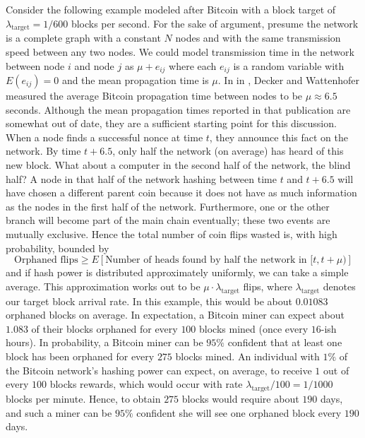 \documentclass[12pt,english]{mrl}
\theoremstyle{definition}
\renewcommand{\geq}{\geqslant}
\numberwithin{equation}{section}
\numberwithin{figure}{section}
\numberwithin{equation}{section}
\numberwithin{equation}{section}
\numberwithin{figure}{section}
\begin{document}
Consider the following example modeled after Bitcoin with a block target of $\lambda_{\text{target}}=1/600$ blocks per second. For the sake of argument, presume the network is a complete graph with a constant $N$ nodes and with the same transmission speed between any two nodes. We could model transmission time in the network between node $i$ and node $j$ as $\mu + e_{ij}$ where each $e_{ij}$ is a random variable with $E(e_{ij}) = 0$ and the mean propagation time is $\mu$. In in \cite{decker2013information}, Decker and Wattenhofer measured the average Bitcoin propagation time between nodes to be $\mu \approx 6.5$ seconds. Although the mean propagation times reported in that publication are somewhat out of date, they are a sufficient starting point for this discussion. When a node finds a successful nonce at time $t$, they announce this fact on the network. By time $t+6.5$, only half the network (on average) has heard of this new block. What about a computer in the second half of the network, the blind half? A node in that half of the network hashing between time $t$ and $t+6.5$ will have chosen a different parent coin because it does not have as much information as the nodes in the first half of the network.  Furthermore, one or the other branch will become part of the main chain eventually; these two events are mutually exclusive. Hence the total number of coin flips wasted is, with high probability, bounded by
\[\text{Orphaned flips} \geq E\left[\text{Number of heads found by half the network in }[t,t+\mu)\right]\]
and if hash power is distributed approximately uniformly, we can take a simple average. This approximation works out to be $\mu\cdot \lambda_{\text{target}}$ flips, where $\lambda_{\text{target}}$ denotes our target block arrival rate. In this example, this would be about $0.01083$ orphaned blocks on average. In expectation, a Bitcoin miner can expect about $1.083$ of their blocks orphaned for every $100$ blocks mined (once every $16$-ish hours). In probability, a Bitcoin miner can be $95\%$ confident that at least one block has been orphaned for every $275$ blocks mined. An individual with $1\%$ of the Bitcoin network's hashing power can expect, on average, to receive $1$ out of every $100$ blocks rewards, which would occur with rate $\lambda_{\text{target}}/100 = 1/1000$ blocks per minute. Hence, to obtain $275$ blocks would require about $190$ days, and such a miner can be $95\%$ confident she will see one orphaned block every $190$ days.
\end{document}
